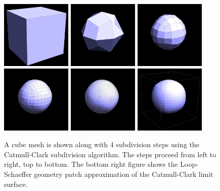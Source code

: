 \documentclass[12pt, letterpaper]{article}
\begin{document}
		\begin{figure}[h]
		\centering
		\includegraphics[width=0.3\textwidth]{cc0}
		\includegraphics[width=0.3\textwidth]{cc1}
		\includegraphics[width=0.3\textwidth]{cc2}
		\includegraphics[width=0.3\textwidth]{cc3}
		\includegraphics[width=0.3\textwidth]{cc4}
		\includegraphics[width=0.3\textwidth]{cc_loop_shaeffer}
		\caption{A cube mesh is shown along with 4 subdivision steps using the Catmull-Clark subdivision algorithm. The steps proceed from left to right, top to bottom.
				The bottom right figure shows the Loop-Schaeffer geometry patch approximation of the Catmull-Clark limit surface.}
		\label{fig:Catmull-Clark}
		\end{figure}
\end{document}
